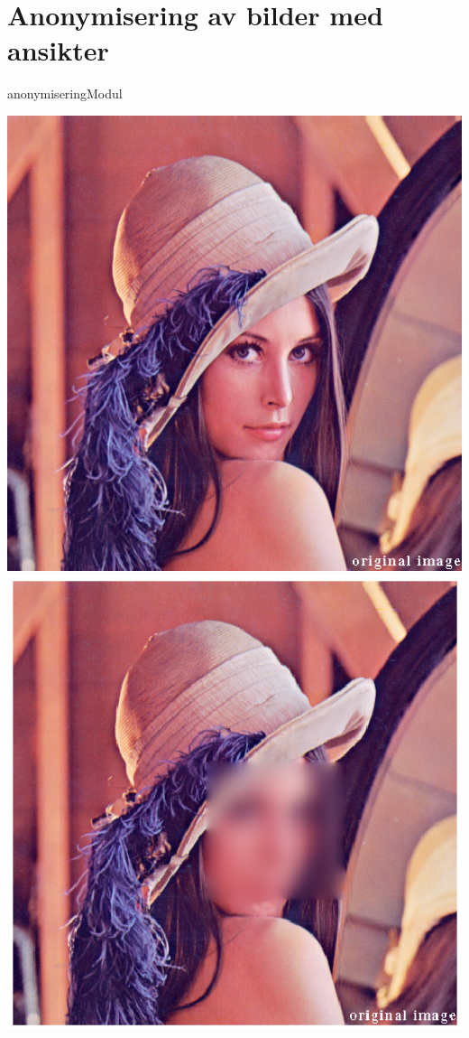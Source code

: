 \section{Anonymisering av bilder med ansikter}
{anonymiseringModul}
\begin{center}
\includegraphics[scale = 0.3]{./images/Anonyme/lena.png}
\includegraphics[scale = 0.28]{./images/Anonyme/lenaBlur.png}
\end{center}